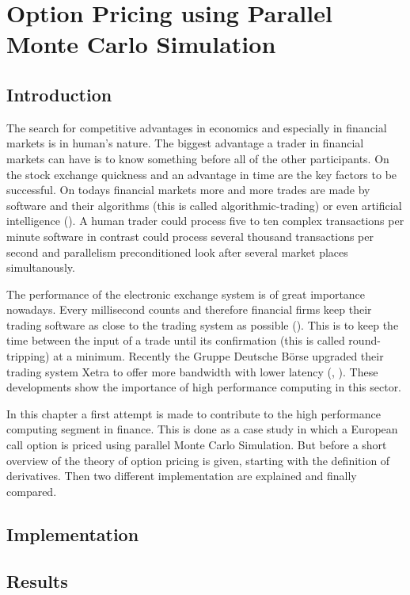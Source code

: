 \chapter{Option Pricing using Parallel Monte Carlo Simulation}
\label{chap:options}
\section{Introduction}
\label{sec:optionintro}

The search for competitive advantages in economics and especially in
financial markets is in human's nature. The biggest advantage a trader
in financial markets can have is to know something before all of the
other participants. On the stock exchange quickness and an advantage
in time are the key factors to be successful. On todays financial
markets more and more trades are made by software and their
algorithms (this is called algorithmic-trading) or even artificial
intelligence (\cite{bloomberg:hal9000}). A human trader could
process five to ten complex 
transactions per minute software in contrast could process several
thousand transactions per second and parallelism preconditioned look
after several market places simultanously.


The performance of the electronic exchange system is of great
importance nowadays. Every millisecond counts and therefore financial
firms keep their trading software as close to the trading system as
possible (\cite{wstonline:cuttingedge}). This is to keep the time
between the input of a trade until its confirmation (this is called
round-tripping) at a minimum. Recently the Gruppe Deutsche B\"orse
upgraded their trading 
system Xetra to offer more bandwidth with lower latency (\cite{gdb:latency},
\cite{gdb:bandwidth}).
These developments show the importance of high performance computing
in this sector.


In this chapter a first attempt is made to contribute to the high performance
computing segment in finance. This is done as a case study in which a
European call option is priced using parallel Monte Carlo
Simulation. But before a short overview of the theory of option
pricing is given, starting with the definition of derivatives. Then
two different implementation are explained and finally compared.

%
\section{Implementation}
\section{Results}

